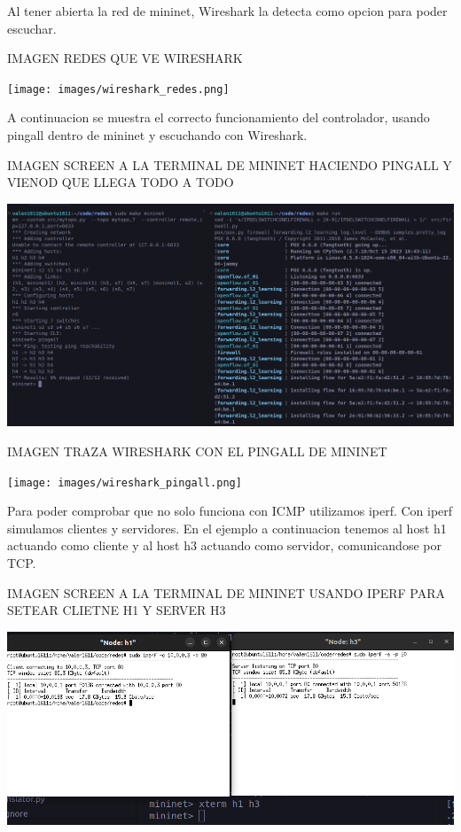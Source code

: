 \documentclass{article}
\begin{document}
Al tener abierta la red de mininet, Wireshark la detecta como opcion para poder escuchar.

IMAGEN REDES QUE VE WIRESHARK
\begin{center}
\texttt{[image: images/wireshark\_redes.png]}
\end{center}

A continuacion se muestra el correcto funcionamiento del controlador, usando pingall dentro de mininet y escuchando con Wireshark.

IMAGEN SCREEN A LA TERMINAL DE MININET HACIENDO PINGALL Y VIENOD QUE LLEGA TODO A TODO
\begin{center}
\includegraphics[scale=0.35]{images/mininet_pingall.png}
\end{center}

IMAGEN TRAZA WIRESHARK CON EL PINGALL DE MININET
\begin{center}
\texttt{[image: images/wireshark\_pingall.png]}
\end{center}


Para poder comprobar que no solo funciona con ICMP utilizamos iperf. Con iperf simulamos
clientes y servidores. En el ejemplo a continuacion tenemos al host h1 actuando como cliente
y al host h3 actuando como servidor, comunicandose por TCP.

IMAGEN SCREEN A LA TERMINAL DE MININET USANDO IPERF PARA SETEAR CLIETNE H1 Y SERVER H3
\begin{center}
\includegraphics[scale=0.35]{images/mininet_iperf_basico.png}
\end{center}
\end{document}
